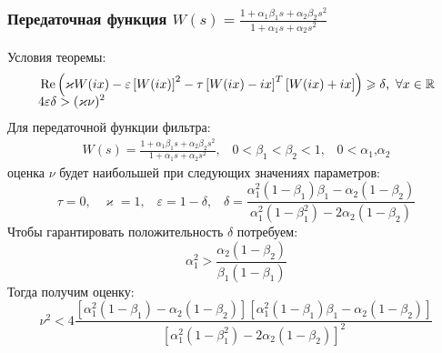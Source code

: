 \documentclass{beamer}
\begin{document}
\begin{frame}
\frametitle{Передаточная функция $W(s) = \frac{1+\alpha_1\beta_1s + \alpha_2\beta_2s^2}{1+\alpha_1s + \alpha_2s^2}$}
Условия теоремы:\vspace{-2mm}
 \begin{align*}
&\operatorname{Re}\left( \varkappa W(ix)- \varepsilon\left[W(ix)\right]^2-\tau\left[ W(ix)-ix \right]^T\left[W(ix)+ix \right]\right) \geqslant \delta \text{,}\enskip\forall x \in \mathbb{R}\\[-2mm]
&4\varepsilon\delta > (\varkappa\nu)^2
\end{align*}
Для передаточной функции фильтра:\vspace{-2mm}
 \begin{equation}\label{filter3}
 \begin{aligned}
W(s) = \frac{1+\alpha_1\beta_1s + \alpha_2\beta_2s^2}{1+\alpha_1s + \alpha_2s^2} \text{,}\quad 0 < \beta_1 < \beta_2 < 1 \text{,}\quad 0 < \alpha_1 \text{,} \alpha_2
 \end{aligned}
\end{equation}
оценка $\nu$ будет наибольшей при следующих значениях параметров:
\vspace{-2mm}
 \begin{equation}\label{filter3-params}
 \tau = 0 \text{,} \quad
 \varkappa = 1 \text{,} \quad
 \varepsilon = 1-\delta \text{,} \quad
 \delta = \frac{\alpha_1^2(1-\beta_1)\beta_1 - \alpha_2(1-\beta_2)}{\alpha_1^2(1-\beta_1^2) - 2\alpha_2(1-\beta_2)}
\end{equation}
Чтобы гарантировать положительность $\delta$ потребуем:\vspace{-2mm}
 \begin{equation}
\alpha_1^2 > \frac{\alpha_2(1-\beta_2)}{\beta_1(1-\beta_1)}
\end{equation}\vspace{-2mm}
Тогда получим оценку:
 \begin{equation*}
\nu^2 < 4\frac{[\alpha_1^2(1-\beta_1) - \alpha_2(1-\beta_2)][\alpha_1^2(1-\beta_1)\beta_1 - \alpha_2(1-\beta_2)]}{[\alpha_1^2(1-\beta_1^2) - 2\alpha_2(1-\beta_2)]^2}
 \end{equation*}
\end{frame}

\end{document}
